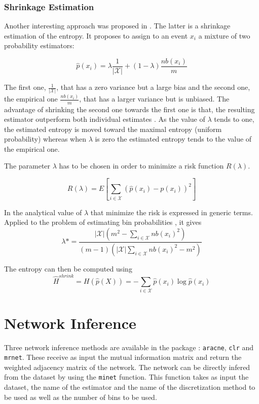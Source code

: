 \documentclass{article}
\newcommand{\Rfunction}[1]{{\texttt{#1}}}
\begin{document}
\subsubsection{Shrinkage Estimation}
Another interesting approach was proposed in \cite{hausser}. The
latter is a shrinkage estimation of the entropy. It proposes to assign
to an event $x_{i}$ a mixture of two probability estimators: 

$$\hat{p}(x_{i})=\lambda\frac{1}{|\mathcal{X}|}+(1-\lambda)\frac{nb(x_{i})}{m}$$

The first one, $\frac{1}{|\mathcal{X}|}$, that has a zero variance
but a large bias and the second one, the empirical one $\frac{nb(x_{i})}{m}$,
that has a larger variance but is unbiased. The advantage of shrinking
the second one towards the first one is that, the resulting estimator
outperform both individual estimates \cite{schafer}.
As the value of $\lambda$ tends to one, the estimated entropy is
moved toward the maximal entropy (uniform probability) whereas when
$\lambda$ is zero the estimated entropy tends to the value of the
empirical one. 

The parameter $\lambda$ has to be chosen in order to minimize a risk
function $R(\lambda)$.

$$R(\lambda)=E[\sum_{i\in\mathcal{X}}(\hat{p}(x_{i})-p(x_{i}))^{2}]$$

In \cite{schafer} the analytical value of $\lambda$
that minimize the risk is expressed in generic terms. Applied to the
problem of estimating bin probabilities \cite{hausser}, it gives
$$\lambda*=\frac{|\mathcal{X}|(m^{2}-\sum_{i\in\mathcal{X}}nb(x_{i})^{2})}{(m-1)(|\mathcal{X}|\sum_{i\in\mathcal{X}}nb(x_{i})^{2}-m^{2})}$$

The entropy can then be computed using
$$\hat{H}^{shrink}=H(\hat{p}(X))=-\sum_{i\in\mathcal{X}}\hat{p}(x_{i})\log\hat{p}(x_{i})$$



\section{Network Inference}
Three network inference methods are available in the package : \Rfunction{aracne}, 
\Rfunction{clr} and \Rfunction{mrnet}. These receive as input the mutual information 
matrix and return the weighted adjacency matrix of the network. The network can be 
directly infered from the dataset by using the \Rfunction{minet} function. This
function takes as input the dataset, the name of the estimator and the name of 
the discretization method to be used as well as the number of bins to be used.
\end{document}
